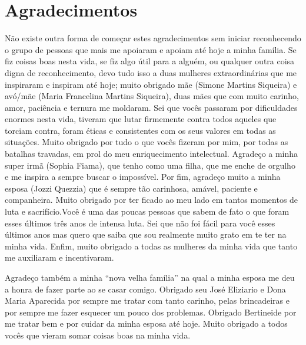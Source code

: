 
\chapter*{Agradecimentos}

Não existe outra forma de começar estes agradecimentos sem iniciar reconhecendo
o grupo de pessoas que mais me apoiaram e apoiam até hoje a minha família. Se
fiz coisas boas nesta vida, se fiz algo útil para a alguém, ou qualquer outra
coisa digna de reconhecimento, devo tudo isso a duas mulheres extraordinárias
que me inspiraram e inspiram até hoje; muito obrigado mãe (Simone Martins
Siqueira) e avó/mãe (Maria Francelina Martins Siqueira), duas mães que com
muito carinho, amor, paciência e ternura me moldaram. Sei que vocês passaram
por dificuldades enormes nesta vida, tiveram que lutar firmemente contra todos
aqueles que torciam contra, foram éticas e consistentes com os seus valores em
todas as situações. Muito obrigado por tudo o que vocês fizeram por mim, por
todas as batalhas travadas, em prol do meu enriquecimento intelectual. Agradeço
a minha super irmã (Sophia Fiama), que tenho como uma filha, que me enche de
orgulho e me inspira a sempre buscar o impossível. Por fim, agradeço muito a
minha esposa (Jozzi Quezzia) que é sempre tão carinhosa, amável, paciente e
companheira. Muito obrigado por ter ficado ao meu lado em tantos momentos de
luta e sacrifício.Você é uma das poucas pessoas que sabem de fato o que foram
esses últimos três anos de intensa luta. Sei que não foi fácil para você esses
últimos anos mas quero que saiba que sou realmente muito grato em te ter na
minha vida. Enfim, muito obrigado a todas as mulheres da minha vida que tanto
me auxiliaram e incentivaram.

Agradeço também a minha “nova velha família” na qual a minha esposa me deu a
honra de fazer parte ao se casar comigo. Obrigado seu José Eliziario e Dona
Maria Aparecida por sempre me tratar com tanto carinho, pelas brincadeiras e
por sempre me fazer esquecer um pouco dos problemas. Obrigado Bertineide por me
tratar bem e por cuidar da minha esposa até hoje. Muito obrigado a todos vocês
que vieram somar coisas boas na minha vida.

